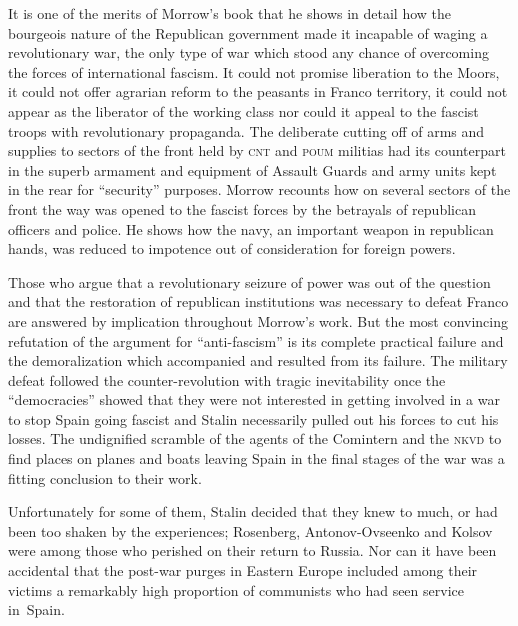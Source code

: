 \dinkus

It is one of the merits of Morrow’s book that he shows in detail how the bourgeois nature of the Republican government made it incapable of waging a revolutionary war, the only type of war which stood any chance of overcoming the forces of international fascism. It could not promise liberation to the Moors, it could not offer agrarian reform to the peasants in Franco territory, it could not appear as the liberator of the working class nor could it appeal to the fascist troops with revolutionary propaganda. The deliberate cutting off of arms and supplies to sectors of the front held by \textsc{cnt} and \textsc{poum} militias had its counterpart in the superb armament and equipment of Assault Guards and army units kept in the rear for ``security'' purposes. Morrow recounts how on several sectors of the front the way was opened to the fascist forces by the betrayals of republican officers and police. He shows how the navy, an important weapon in republican hands, was reduced to impotence out of consideration for foreign powers.

Those who argue that a revolutionary seizure of power was out of the question and that the restoration of republican institutions was necessary to defeat Franco are answered by implication throughout Morrow’s work.%
\endnote{[At this point, the \textsc{mia} edition reads: ``They are dealt with more specifically on pages 82--91 which rank among the most important in the book and to which, therefore, the reader is especially referred.''}
But the most convincing refutation of the argument for ``anti-fascism'' is its complete practical failure and the demoralization which accompanied and resulted from its failure. The military defeat followed the  counter-revolution with tragic inevitability once the ``democracies'' showed that they were not interested in getting involved in a war to stop Spain going fascist and Stalin necessarily pulled out his forces to cut his losses. The undignified scramble of the agents of the Comintern and the \textsc{nkvd} to find places on planes and boats leaving Spain in the final stages of the war was a fitting conclusion to their work. 

Unfortunately for some of them, Stalin decided that they knew to much, or had been too shaken by the experiences; Rosenberg, Antonov-Ovseenko and Kolsov were among those who perished on their return to Russia. Nor can it have been accidental that the post-war purges in Eastern Europe included among their victims a remarkably high proportion of communists who had seen service in~Spain.


